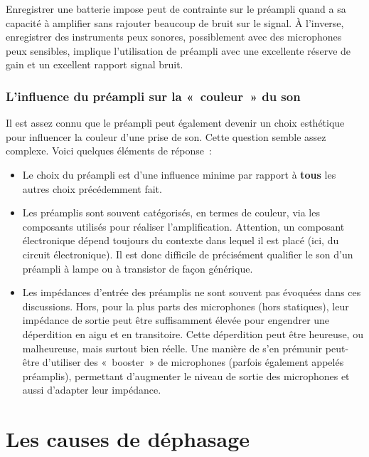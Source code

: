 \documentclass[
]{book}
\providecommand{\tightlist}{%
  \setlength{\itemsep}{0pt}\setlength{\parskip}{0pt}}
\begin{document}
Enregistrer une batterie impose peut de contrainte sur le préampli quand a sa capacité à amplifier sans rajouter beaucoup de bruit sur le signal. À l'inverse, enregistrer des instruments peux sonores, possiblement avec des microphones peux sensibles, implique l'utilisation de préampli avec une excellente réserve de gain et un excellent rapport signal bruit.

\hypertarget{linfluence-du-pruxe9ampli-sur-la-couleur-du-son}{%
\subsection{L'influence du préampli sur la «~couleur~» du son}\label{linfluence-du-pruxe9ampli-sur-la-couleur-du-son}}

Il est assez connu que le préampli peut également devenir un choix esthétique pour influencer la couleur d'une prise de son. Cette question semble assez complexe. Voici quelques éléments de réponse~:

\begin{itemize}
\tightlist
\item
  Le choix du préampli est d'une influence minime par rapport à \textbf{tous} les autres choix précédemment fait.
\item
  Les préamplis sont souvent catégorisés, en termes de couleur, via les composants utilisés pour réaliser l'amplification. Attention, un composant électronique dépend toujours du contexte dans lequel il est placé (ici, du circuit électronique). Il est donc difficile de précisément qualifier le son d'un préampli à lampe ou à transistor de façon générique.
\item
  Les impédances d'entrée des préamplis ne sont souvent pas évoquées dans ces discussions. Hors, pour la plus parts des microphones (hors statiques), leur impédance de sortie peut être suffisamment élevée pour engendrer une déperdition en aigu et en transitoire. Cette déperdition peut être heureuse, ou malheureuse, mais surtout bien réelle. Une manière de s'en prémunir peut-être d'utiliser des «~booster~» de microphones (parfois également appelés préamplis), permettant d'augmenter le niveau de sortie des microphones et aussi d'adapter leur impédance.
\end{itemize}

\hypertarget{les-causes-de-duxe9phasage}{%
\chapter{Les causes de déphasage}\label{les-causes-de-duxe9phasage}}
\end{document}
